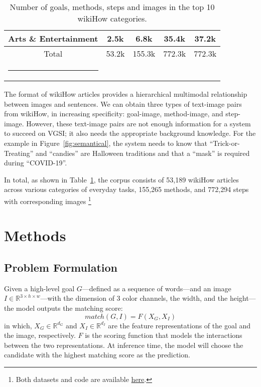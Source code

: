 \documentclass[11pt]{article}
\makeatletter
\newcommand{\thickhline}{\noalign {\ifnum 0=`}\fi \hrule height 1pt
    \futurelet \reserved@a \@xhline
}
\makeatother
\begin{document}
\begin{table}[!t]
{\begin{tabular}{ccccc}
Arts \& Entertainment                                                  & 2.5k                      & 6.8k                       & 35.4k                      & 37.2k                      \\ \hline
Total                                                                  & \multicolumn{1}{l}{53.2k} & \multicolumn{1}{l}{155.3k} & \multicolumn{1}{l}{772.3k} & \multicolumn{1}{l}{772.3k} \\ \thickhline
\end{tabular}
}
\captionsetup{justification=centering}
\caption{Number of goals, methods, steps and images in the top 10 wikiHow categories.}\vspace{-0.5cm}
\label{category}
\end{table}

The format of wikiHow articles provides a hierarchical multimodal relationship between images and sentences. We can obtain three types of text-image pairs from wikiHow, in increasing specificity: goal-image, method-image, and step-image. However, these text-image pairs are not enough information for a system to succeed on VGSI; it also needs the appropriate background knowledge. For the example in Figure~\ref{fig:semantical}, the system needs to know that ``Trick-or-Treating'' and ``candies'' are Halloween traditions and that a ``mask'' is required during ``COVID-19''.

In total, as shown in Table~\ref{category}, the corpus consists of 53,189 wikiHow articles across various categories of everyday tasks, 155,265 methods, and 772,294 steps with corresponding images \footnote{Both datasets and code are available \href{https://github.com/YueYANG1996/wikiHow-VGSI}{here}.}

\section{Methods}
\subsection{Problem Formulation}
Given a high-level goal $G$---defined as a sequence of words---and an image $I \in \mathbb{R}^{3 \times h \times w}$---with the dimension of 3 color channels, the width, and the height---the model outputs the matching score:
\begin{equation} \label{eq1}
    match(G, I) = F (X_G, X_I)
\end{equation}
in which, $X_G \in \mathbb{R}^{d_G} $ and $X_I \in \mathbb{R}^{d_I}$ are the feature representations of the goal and the image, respectively. $F$ is the scoring function that models the interactions between the two representations. At inference time, the model will choose the candidate with the highest matching score as the prediction.
\end{document}
